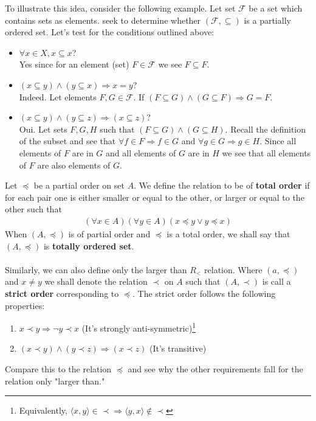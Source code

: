\documentclass{tufte-handout} %
\theoremstyle{definition}
\theoremstyle{remark}
\begin{document}
To illustrate this idea, consider the following example. Let set $\mathcal{F}$ be a set which contains sets as elements.  seek to determine whether $(\mathcal{F}, \subseteq)$ is a partially ordered set. Let's test for the conditions outlined above:
\begin{itemize}
    \item $\forall x\in X, x \subseteq x$? \\ Yes since for an element (set) $F\in \mathcal{F}$ we see $F\subseteq F$.
    \item $(x \subseteq y) \land (y \subseteq x) \Rightarrow x=y$? \\ Indeed. Let elements $F,G \in \mathcal{F}$. If $(F \subseteq G) \land (G\subseteq F) \Rightarrow G=F$.
    \item $(x \subseteq y) \land (y \subseteq z) \Rightarrow (x \subseteq z)$? \\ Oui. Let sets $F,G,H$ such that $(F\subseteq G) \land (G \subseteq H)$. Recall the definition of the subset and see that $\forall f\in F \Rightarrow f\in G$ and $\forall g\in G \Rightarrow g\in H$. Since all elements of $F$ are in $G$ and all elements of $G$ are in $H$ we see that all elements of $F$ are also elements of $G$.
\end{itemize}
Let $\preccurlyeq$ be a partial order on set $A$. We define the relation to be of \textbf{total order} if for each pair  one is either smaller or equal to the other, or larger or equal to the other such that
\begin{align*}
    (\forall x \in A)(\forall y \in A)(x\preccurlyeq y \vee y \preccurlyeq x)
\end{align*}
When $(A,\preccurlyeq)$ is of partial order and $\preccurlyeq$ is a total order, we shall say that $(A,\preccurlyeq)$ is \textbf{totally ordered set}.
\\\\
Similarly, we can also define only the larger than $R_{<}$ relation. Where $(a,\preccurlyeq)$ and $x\neq y$ we shall denote the relation $\prec$ on $A$ such that $(A,\prec)$ is call a \textbf{strict order} corresponding to $\preccurlyeq$. The strict order follows the following properties: 
\begin{enumerate}
    \item $x \prec y \Rightarrow \neg y\prec x$ (It's strongly anti-symmetric)\footnote{Equivalently, $\langle x,y \rangle \in \prec \Rightarrow \langle y,x \rangle \not\in \prec$} 
    \item $(x \prec y) \land (y \prec z) \Rightarrow (x \prec z)$ (It's transitive)
\end{enumerate}
Compare this to the relation $\preccurlyeq$ and see why the other requirements fall for the relation only "larger than."
\end{document}
